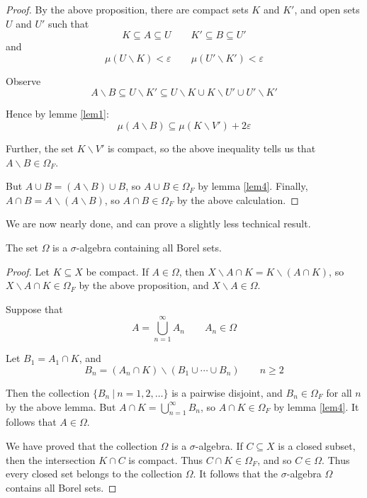 \begin{proof}
By the above proposition, there are compact sets $K$ and $K'$, and open sets $U$ and $U'$ such that
$$K\subseteq A\subseteq U \qquad K'\subseteq B\subseteq U'$$
and
$$\mu (U\backslash K)< \varepsilon \qquad \mu (U'\backslash K') <\varepsilon$$

Observe
$$A\backslash B \subseteq U\backslash K' \subseteq U\backslash K \cup K\backslash U'\cup U'\backslash K'$$

Hence by lemme \ref{lem1}:
$$\mu (A\backslash B) \subseteq \mu (K\backslash V') +2\varepsilon$$

Further, the set $K\backslash V'$ is compact, so the above inequality tells us that $A\backslash B \in \Omega_F$.

But $A\cup B = (A\backslash B)\cup B$, so $A\cup B \in \Omega_F$ by lemma \ref{lem4}.  Finally, $A\cap B = A\backslash (A\backslash B)$, so $A\cap B\in \Omega_F$ by the above calculation.
\end{proof}

We are now nearly done, and can prove a slightly less technical result.

\begin{theorem}
The set $\Omega$ is a $\sigma$-algebra containing all Borel sets.
\end{theorem}

\begin{proof}
Let $K\subseteq X$ be compact.  If $A\in \Omega$, then $X\backslash A \cap K = K \backslash (A\cap K)$, so $X\backslash A \cap K\in \Omega_F$  by the above proposition, and $X\backslash A\in \Omega$.

Suppose that
$$A = \bigcup_{n=1}^\infty A_n \qquad A_n \in \Omega$$

Let $B_1 = A_1 \cap K$, and
$$B_n = (A_n \cap K) \backslash (B_1 \cup \cdots \cup B_n) \qquad n\geq 2$$

Then the collection $\{ B_n \ |\ n=1,2,\ldots \}$ is a pairwise disjoint, and $B_n \in \Omega_F$ for all $n$ by the above lemma.  But $A\cap K =\bigcup_{n=1}^\infty B_n$, so $A\cap K \in \Omega_F$ by lemma \ref{lem4}.  It follows that $A\in \Omega$.

We have proved that the collection $\Omega$ is a $\sigma$-algebra.  If $C\subseteq X$ is a closed subset, then the intersection $K\cap C$ is compact.  Thus $C\cap K \in \Omega_F$, and so $C\in \Omega$.  Thus every closed set belongs to the collection $\Omega$.  It follows that the $\sigma$-algebra $\Omega$ contains all Borel sets.
\end{proof}

